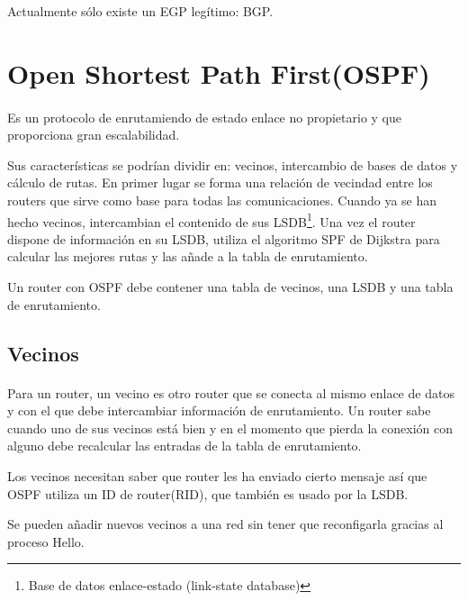 \documentclass[a4paper,11pt]{article}
\begin{document}
Actualmente sólo existe un EGP legítimo: BGP.


\section{Open Shortest Path First(OSPF)}\label{sec:ospf}
\paragraph{  }
Es un protocolo de enrutamiendo de estado enlace no propietario y que proporciona gran escalabilidad.

Sus características se podrían dividir en: vecinos, intercambio de bases de datos y cálculo de rutas. En primer lugar se forma una relación de vecindad entre los routers que sirve como base para todas las comunicaciones. Cuando ya se han hecho vecinos, intercambian el contenido de sus LSDB\footnote{Base de datos enlace-estado (link-state database)}. Una vez el router dispone de información en su LSDB, utiliza el algoritmo SPF de Dijkstra para calcular las mejores rutas y las añade a la tabla de enrutamiento.

Un router con OSPF debe contener una tabla de vecinos, una LSDB y una tabla de enrutamiento.

\subsection{Vecinos}
\paragraph{  }
Para un router, un vecino es otro router que se conecta al mismo enlace de datos y con el que debe intercambiar información de enrutamiento. Un router sabe cuando uno de sus vecinos está bien y en el momento que pierda la conexión con alguno debe recalcular las entradas de la tabla de enrutamiento.

Los vecinos necesitan saber que router les ha enviado cierto mensaje así que OSPF utiliza un ID de router(RID), que también es usado por la LSDB.

 Se pueden añadir nuevos vecinos a una red sin tener que reconfigarla gracias al proceso Hello.
\end{document}
